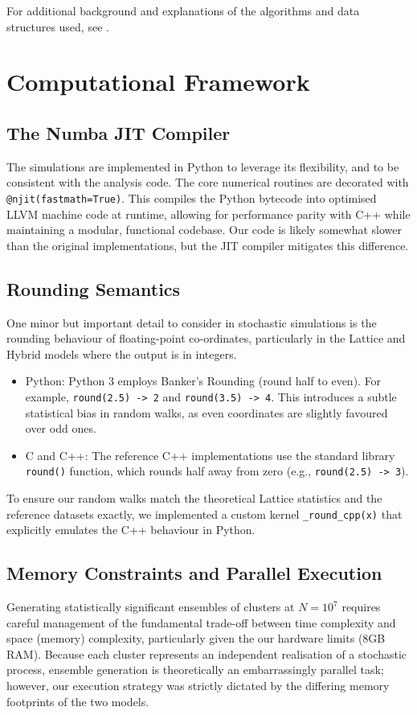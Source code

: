 \documentclass[12pt, a4paper, oneside]{report}
\theoremstyle{remark}
\begin{document}
For additional background and explanations of the algorithms and data structures used, see \cite{Cormen2009}.

\section{Computational Framework}

\subsection{The Numba JIT Compiler}
The simulations are implemented in Python to leverage its flexibility, and to be consistent with the analysis code. The core numerical routines are decorated with \texttt{@njit(fastmath=True)}. This compiles the Python bytecode into optimised LLVM machine code at runtime, allowing for performance parity with C++ while maintaining a modular, functional codebase. Our code is likely somewhat slower than the original implementations, but the JIT compiler mitigates this difference.

\subsection{Rounding Semantics}
One minor but important detail to consider in stochastic simulations is the rounding behaviour of floating-point co-ordinates, particularly in the Lattice and Hybrid models where the output is in integers.
\begin{itemize}
    \item Python: Python 3 employs Banker's Rounding (round half to even). For example, \texttt{round(2.5) -> 2} and \texttt{round(3.5) -> 4}. This introduces a subtle statistical bias in random walks, as even coordinates are slightly favoured over odd ones.
    \item C and C++: The reference C++ implementations use the standard library \texttt{round()} function, which rounds half away from zero (e.g., \texttt{round(2.5) -> 3}).
\end{itemize}
To ensure our random walks match the theoretical Lattice statistics and the reference datasets exactly, we implemented a custom kernel \texttt{\_round\_cpp(x)} that explicitly emulates the C++ behaviour in Python.
\subsection{Memory Constraints and Parallel Execution}
Generating statistically significant ensembles of clusters at $N=10^7$ requires careful management of the fundamental trade-off between time complexity and space (memory) complexity, particularly given the our hardware limits (8GB RAM). Because each cluster represents an independent realisation of a stochastic process, ensemble generation is theoretically an embarrassingly parallel task; however, our execution strategy was strictly dictated by the differing memory footprints of the two models.
\end{document}
